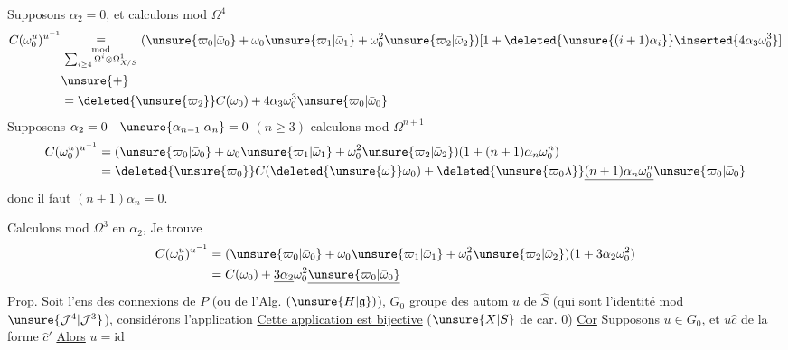 Supposons $\alpha_2=0$, et calculons mod $\Omega^4$
\[
\begin{aligned}
C(\omega_0^u)^{u^{-1}}
&\underset{\substack{\mathrm{mod}\\\sum_{i\geq4}\Omega^i\otimes\Omega^1_{X/S}}}{\equiv}
(\unsure{\varpi_0|\bar\omega_0}+\omega_0\unsure{\varpi_1|\bar\omega_1}+\omega_0^2\unsure{\varpi_2|\bar\omega_2})
[1+\deleted{\unsure{(i+1)\alpha_i}}\inserted{4\alpha_3\omega_0^3}]\\
&\unsure{+}\\
&=\deleted{\unsure{\varpi_2}}C(\omega_0)+4\alpha_3\omega_0^3\unsure{\varpi_0|\bar\omega_0}
\end{aligned}
\]
Supposons $\alpha_2=0\quad\unsure{\alpha_{n-1}|\alpha_n}=0$ $(n\geq3)$ calculons mod $\Omega^{n+1}$
\[
\begin{aligned}
C(\omega_0^u)^{u^{-1}}&=(\unsure{\varpi_0|\bar\omega_0}+\omega_0\unsure{\varpi_1|\bar\omega_1}+\omega_0^2\unsure{\varpi_2|\bar\omega_2})(1+(n+1)\alpha_n\omega_0^n)\\
&=\deleted{\unsure{\varpi_0}}C(\deleted{\unsure{\omega}}\omega_0)+\deleted{\unsure{\varpi_0\lambda}}\underline{(n+1)\alpha_n\omega_0^n}\unsure{\varpi_0|\bar\omega_0}
\end{aligned}
\]
donc il faut $(n+1)\alpha_n=0$.

Calculons mod $\Omega^3$ en   $\alpha_2$,
Je trouve
\[
\begin{aligned}
C(\omega_0^u)^{u^{-1}}&=(\unsure{\varpi_0|\bar\omega_0}+\omega_0\unsure{\varpi_1|\bar\omega_1}+\omega_0^2\unsure{\varpi_2|\bar\omega_2})(1+3\alpha_2\omega_0^2)\\
&=C(\omega_0)+\underline{3\alpha_2}\omega_0^2\underline{\unsure{\varpi_0|\bar\omega_0}}
\end{aligned}
\]
\uline{Prop.} Soit  l'ens des connexions  de $P$ (ou de l'Alg.  $(\unsure{H|\mathfrak g})$),  $G_0$  groupe des autom $u$ de $\widehat S$  (qui sont l'identité mod $\unsure{\mathcal J^4|\mathcal J^3}$), considérons l'application
\uline{Cette application est bijective} ($\unsure{X|S}$ de car. $0$)
\uline{Cor} Supposons $u\in G_0$,  et $u\widehat c$ de la forme $\widehat c'$
\uline{Alors} $u=\mathrm{id}$

